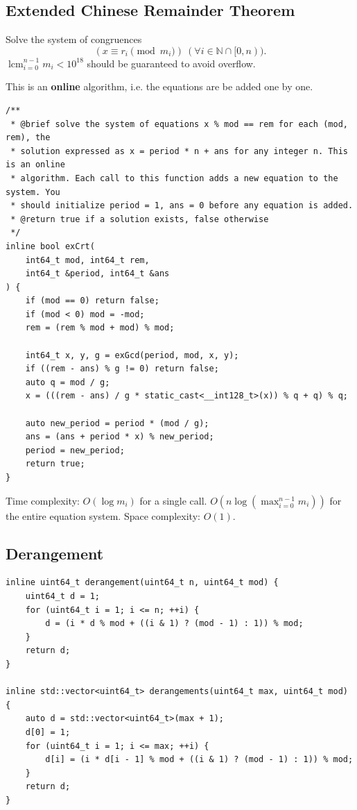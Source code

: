 \documentclass[UTF8]{article}
\begin{document}
\subsection{Extended Chinese Remainder Theorem}

Solve the system of congruences
$$
(x\equiv r_i\pmod{m_i})\ (\forall i\in\mathbb{N}\cap[0,n)).
$$
$\operatorname{lcm}_{i=0}^{n-1}m_i<10^{18}$ should be guaranteed to avoid overflow.

This is an \textbf{online} algorithm, i.e. the equations are be added one by one.

\begin{verbatim}
/**
 * @brief solve the system of equations x % mod == rem for each (mod, rem), the
 * solution expressed as x = period * n + ans for any integer n. This is an online
 * algorithm. Each call to this function adds a new equation to the system. You
 * should initialize period = 1, ans = 0 before any equation is added.
 * @return true if a solution exists, false otherwise 
 */
inline bool exCrt(
	int64_t mod, int64_t rem,
	int64_t &period, int64_t &ans
) {
	if (mod == 0) return false;
	if (mod < 0) mod = -mod;
	rem = (rem % mod + mod) % mod;

	int64_t x, y, g = exGcd(period, mod, x, y);
	if ((rem - ans) % g != 0) return false;
	auto q = mod / g;
	x = (((rem - ans) / g * static_cast<__int128_t>(x)) % q + q) % q;

	auto new_period = period * (mod / g);
	ans = (ans + period * x) % new_period;
	period = new_period;
	return true;
}
\end{verbatim}

Time complexity: $O(\log m_i)$ for a single call. $O\left(n\log\left(\max_{i=0}^{n-1}m_i\right)\right)$ for the entire equation system.
Space complexity: $O(1)$.

\subsection{Derangement}
\begin{verbatim}
inline uint64_t derangement(uint64_t n, uint64_t mod) {
	uint64_t d = 1;
	for (uint64_t i = 1; i <= n; ++i) {
		d = (i * d % mod + ((i & 1) ? (mod - 1) : 1)) % mod;
	}
	return d;
}

inline std::vector<uint64_t> derangements(uint64_t max, uint64_t mod) {
	auto d = std::vector<uint64_t>(max + 1);
	d[0] = 1;
	for (uint64_t i = 1; i <= max; ++i) {
		d[i] = (i * d[i - 1] % mod + ((i & 1) ? (mod - 1) : 1)) % mod;
	}
	return d;
}
\end{verbatim}
\end{document}
